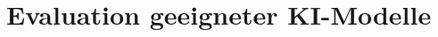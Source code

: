 
\chapter{Evaluation geeigneter KI-Modelle}
\newpage
\null
\newpage
\null
\newpage
\null
\newpage
\null
